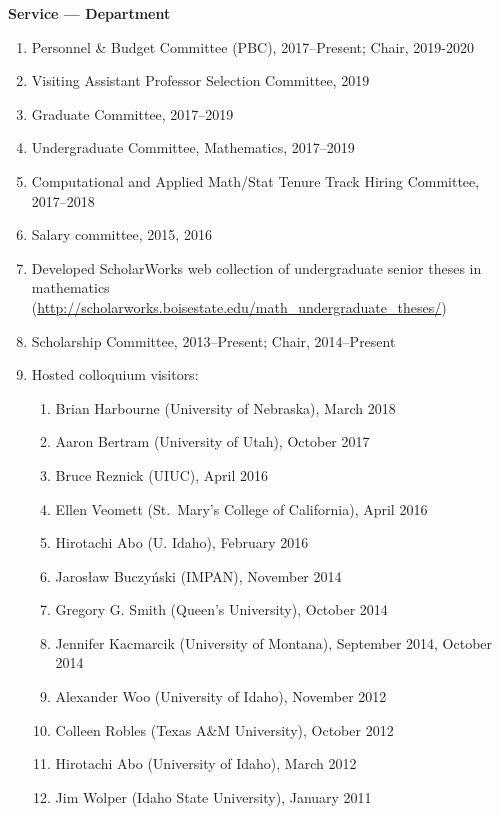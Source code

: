 \documentclass[12pt]{article}
\begin{document}
\textbf{Service --- Department}
\begin{enumerate}[revarabic]

\item Personnel \& Budget Committee (PBC), 2017--Present; Chair, 2019-2020

\item Visiting Assistant Professor Selection Committee, 2019

\item Graduate Committee, 2017--2019

\item Undergraduate Committee, Mathematics, 2017--2019

\item Computational and Applied Math/Stat Tenure Track Hiring Committee, 2017--2018

\item Salary committee, 2015, 2016

\item Developed ScholarWorks web collection of undergraduate senior theses in mathematics
(\url{http://scholarworks.boisestate.edu/math_undergraduate_theses/})


\item Scholarship Committee, 2013--Present; Chair, 2014--Present

\item Hosted colloquium visitors:
\begin{enumerate}
\item Brian Harbourne (University of Nebraska), March 2018
\item Aaron Bertram (University of Utah), October 2017
\item Bruce Reznick (UIUC), April 2016
\item Ellen Veomett (St.\ Mary's College of California), April 2016
\item Hirotachi Abo (U. Idaho), February 2016
\item Jaros{\l}aw Buczy\'nski (IMPAN), November 2014
\item Gregory G. Smith (Queen's University), October 2014
\item Jennifer Kacmarcik (University of Montana), September 2014, October 2014 %
\item Alexander Woo (University of Idaho), November 2012
\item Colleen Robles (Texas A\&M University), October 2012
\item Hirotachi Abo (University of Idaho), March 2012
\item Jim Wolper (Idaho State University), January 2011
\end{enumerate}


\end{enumerate}
\end{document}
